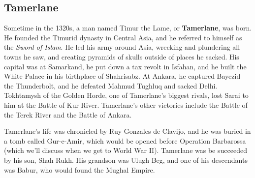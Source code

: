 \subsection*{Tamerlane}

Sometime in the 1320s, a man named Timur the Lame, or \textbf{Tamerlane}, was born.
He founded the Timurid dynasty in Central Asia, and he referred to himself as the \textit{Sword of Islam}.
He led his army around Asia, wrecking and plundering all towns he saw,
and creating pyramids of skulls outside of places he sacked.
His capital was at Samarkand, he put down a tax revolt in Isfahan,
and he built the White Palace in his birthplace of Shahrisabz.
At Ankara, he captured Bayezid the Thunderbolt,
and he defeated Mahmud Tughluq and sacked Delhi.
Tokhtamysh of the Golden Horde, one of Tamerlane's biggest rivals, lost Sarai to him at the Battle of Kur River.
Tamerlane's other victories include the Battle of the Terek River and the Battle of Ankara.

Tamerlane's life was chronicled by Ruy Gonzales de Clavijo, and he was buried in a tomb called Gur-e-Amir,
which would be opened before Operation Barbarossa (which we'll discuss when we get to World War II).
Tamerlane was be succeeded by his son, Shah Rukh.
His grandson was Ulugh Beg, and one of his descendants was Babur, who would found the Mughal Empire.
